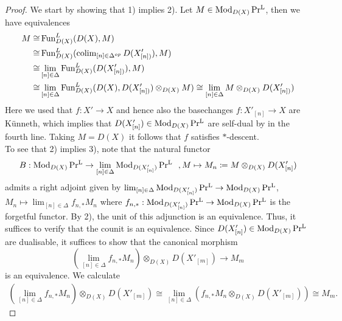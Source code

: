 \begin{proof}
We start by showing that 1) implies 2). Let $M\in \operatorname{Mod}_{D(X)}\operatorname{Pr^{L}}$, then we have equivalences 
\begin{align*}
M\cong & \operatorname{Fun}_{D(X)}^L(D(X),M) \\
\cong & \operatorname{Fun}_{D(X)}^L(\operatorname{colim}_{[n]\in \Delta^{op}}D(X'_{[n])}),M)\\
\cong & \lim_{[n]\in \Delta}\operatorname{Fun}_{D(X)}^L(D(X'_{[n])}),M)\\ 
\cong & \lim_{[n]\in \Delta}\operatorname{Fun}_{D(X)}^L(D(X), D(X'_{[n])})\otimes_{D(X)}M)\cong \lim_{[n]\in \Delta} M \otimes_{D(X)}D(X'_{[n])})
\end{align*}
Here we used that $f: X' \to X$ and hence also the basechanges $f: X'_{[n]} \to X$ are Künneth, which implies that $D(X'_{[n]})\in \operatorname{Mod}_{D(X)}\operatorname{Pr^{L}}$ are self-dual by   in the fourth line. Taking $M=D(X)$ it follows that $f$ satisfies $*$-descent.\\
To see that 2) implies 3), note that the natural functor 
\[
B: \operatorname{Mod}_{D(X)}\operatorname{Pr^{L}} \to \lim_{[n]\in \Delta} \operatorname{Mod}_{D(X'_{[n]})}\operatorname{Pr^{L}}  \ \ , M \mapsto M_n\coloneqq M \otimes_{D(X)}D(X'_{[n]})
\]
admits a right adjoint given by $\lim_{[n]\in \Delta} \operatorname{Mod}_{D(X'_{[n]})}\operatorname{Pr^{L}} \to \operatorname{Mod}_{D(X)}\operatorname{Pr^{L}}$, $M_n \mapsto \lim_{[n]\in \Delta} f_{n,*}M_n $ where $f_{n,*}: \operatorname{Mod}_{D(X'_{[n]})}\operatorname{Pr^{L}} \to \operatorname{Mod}_{D(X)}\operatorname{Pr^{L}} $ is the forgetful functor. By 2), the unit of this adjunction is an equivalence. Thus, it suffices to verify that the counit is an equivalence. Since  $D(X'_{[n]})\in \operatorname{Mod}_{D(X)}\operatorname{Pr^{L}}$ are dualisable, it suffices to show that the canonical morphism 
\[
(\lim_{[n]\in \Delta} f_{n,*}M_n) \otimes_{D(X)}D(X'_{[m]}) \to  M_m
\]
is an equivalence. We calculate 
\begin{align*}
  (\lim_{[n]\in \Delta} f_{n,*}M_n) \otimes_{D(X)}D(X'_{[m]}) \cong  \lim_{[n]\in \Delta} (f_{n,*}M_n \otimes_{D(X)}D(X'_{[m]})) \cong M_m. 
\end{align*}
\end{proof}

